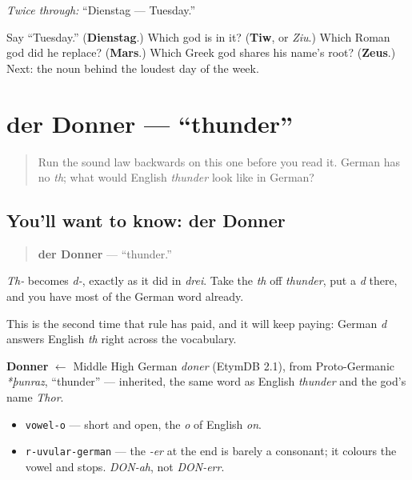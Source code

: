 \emph{Twice through:} \textquotedblleft{}Dienstag — Tuesday.\textquotedblright{}

\begin{tcolorbox}[breakable,colback=teal!4,colframe=teal!35!black,title={Before you move on}]
Say \textquotedblleft{}Tuesday.\textquotedblright{} (\textbf{Dienstag}.) Which god is in it? (\textbf{Tiw}, or \emph{Ziu}.) Which Roman god did he replace? (\textbf{Mars}.) Which Greek god shares his name's root? (\textbf{Zeus}.) Next: the noun behind the loudest day of the week.
\end{tcolorbox}
\section[der Donner]{der Donner — \textquotedblleft{}thunder\textquotedblright{}}

\label{lesson:GE-C07-donner}



\begin{quote}
Run the sound law backwards on this one before you read it. German has no \emph{th}; what would English \emph{thunder} look like in German?
\end{quote}

\subsection*{You'll want to know: der Donner}
\begin{quote}
\textbf{der Donner} — \textquotedblleft{}thunder.\textquotedblright{}
\end{quote}

\emph{Th-} becomes \emph{d-}, exactly as it did in \emph{drei}. Take the \emph{th} off \emph{thunder}, put a \emph{d} there, and you have most of the German word already.

This is the second time that rule has paid, and it will keep paying: German \emph{d} answers English \emph{th} right across the vocabulary.

\begin{cousinweb}
\textbf{Donner} $\leftarrow$ Middle High German \emph{doner} (EtymDB 2.1), from Proto-Germanic \emph{*þunraz}, \textquotedblleft{}thunder\textquotedblright{} — inherited, the same word as English \emph{thunder} and the god's name \emph{Thor}.
\end{cousinweb}

\begin{sounds}
\begin{itemize}
\raggedright
  \item \texttt{vowel-o} — short and open, the \emph{o} of English \emph{on}.
  \item \texttt{r-uvular-german} — the \emph{-er} at the end is barely a consonant; it colours the vowel and stops. \emph{DON-ah}, not \emph{DON-err}.
\end{itemize}
\end{sounds}

